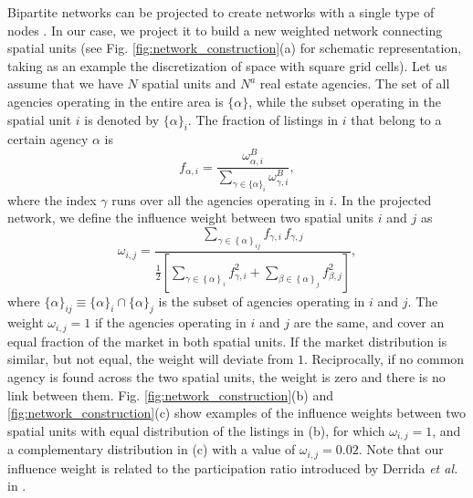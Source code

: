 Bipartite networks can be projected to create networks with a single type of nodes \cite{newman2003structure,newman2001scientific,zhou2007bipartite}. In our case, we project it to build a new weighted network connecting spatial units (see Fig. \ref{fig:network_construction}(a) for schematic representation, taking as an example the discretization of space with square grid cells). Let us assume that we have $N$ spatial units and $N^a$ real estate agencies. The set of all agencies operating in the entire area is $\{ \alpha \}$, while the subset operating in the spatial unit $i$ is denoted by $\{ \alpha \}_i$. The fraction of listings in $i$ that belong to a certain agency $\alpha$ is
\begin{equation}
    f_{\alpha, i} = \frac{\omega^{B}_{\alpha, i}}{\sum_{\gamma \in \{ \alpha \}_i} \omega^{B}_{\gamma, i}},
\end{equation}
where the index $\gamma$ runs over all the agencies operating in $i$. In the projected network, we define the influence weight between two spatial units $i$ and $j$ as
\begin{equation}
\omega_{i,j} = \frac{\sum_{\gamma \in \left\{ \alpha \right\}_{ij}} f_{\gamma,i} \, f_{\gamma,j}}{ \frac{1}{2} \left[ \sum_{\gamma \in \left\{ \alpha \right\}_{i}} f^2_{\gamma, i} + \sum_{\beta \in \left\{ \alpha \right\}_{j}} f^2_{\beta, j} \right]},
\label{eq:weight_eq}
\end{equation}
where $\{ \alpha \}_{ij} \equiv \{\alpha\}_i \cap \{\alpha\}_j$ is the subset of agencies operating in $i$ and $j$. The weight $\omega_{i,j} =1 $ if the agencies operating in $i$ and $j$ are the same, and cover an equal fraction of the market in both spatial units. If the market distribution is similar, but not equal, the weight will deviate from $1$. Reciprocally, if no common agency is found across the two spatial units, the weight is zero and there is no link between them. Fig. \ref{fig:network_construction}(b) and \ref{fig:network_construction}(c) show examples of the influence weights between two spatial units with equal distribution of the listings in (b), for which $\omega_{i,j} =1 $, and a complementary distribution in (c) with a value of $\omega_{i,j} = 0.02$. Note that our influence weight is related to the participation ratio introduced by Derrida \textit{et al.} in \cite{Derrida_1987}. 

